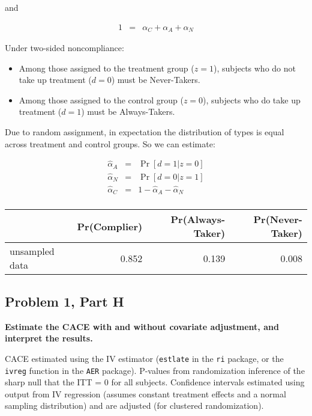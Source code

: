 \documentclass[11pt,notitlepage]{article}
\def\Pr{\mathop{\text{Pr}}}
\begin{document}
and

\begin{eqnarray*}
1 &=& \alpha_C + \alpha_A + \alpha_N
\end{eqnarray*}

Under two-sided noncompliance:

\begin{itemize}
\item Among those assigned to the treatment group ($z=1$), subjects who do not take up treatment ($d=0$) must be Never-Takers.
\item Among those assigned to the control group ($z=0$), subjects who do take up treatment ($d=1$) must be Always-Takers.
\end{itemize}

Due to random assignment, in expectation the distribution of types is equal across treatment and control groups. So we can estimate:

\begin{eqnarray*}
\hat{\alpha}_A &=& \Pr[d=1 | z=0] \\
\hat{\alpha}_N &=& \Pr[d=0 | z=1] \\
\hat{\alpha}_C &=& 1 - \hat{\alpha}_A - \hat{\alpha}_N \\
\end{eqnarray*}

\begin{table}[h!]
\begin{center}
\begin{tabular}{lrrr}
  \hline
   & Pr(Complier) & Pr(Always-Taker) & Pr(Never-Taker) \\ 
  \hline
unsampled data & 0.852 & 0.139 & 0.008 \\ 
   \hline
\end{tabular}
\end{center}
\end{table}



\subsection{Problem 1, Part H} {\bf Estimate the CACE with and without covariate adjustment, and interpret the results.}

\vspace{1cm}


CACE estimated using the IV estimator ({\tt estlate} in the {\tt ri} package, or the {\tt ivreg} function in the {\tt AER} package). P-values from randomization inference of the sharp null that the ITT = 0 for all subjects. Confidence intervals estimated using output from IV regression (assumes constant treatment effects and a normal sampling distribution) and are adjusted (for clustered randomization).
\end{document}

